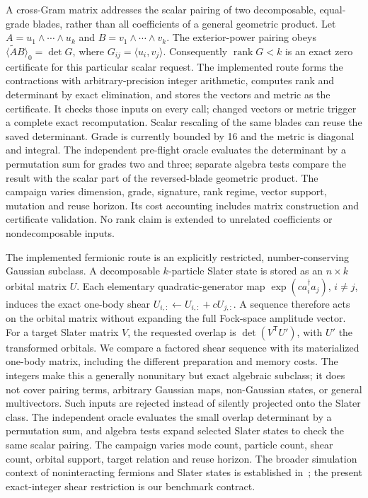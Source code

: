 \documentclass[11pt,a4paper]{article}
\begin{document}
A cross-Gram matrix addresses the scalar pairing of two
decomposable, equal-grade blades, rather than all coefficients of a
general geometric product. Let
\(A=u_1\wedge\cdots\wedge u_k\) and
\(B=v_1\wedge\cdots\wedge v_k\). The exterior-power pairing obeys
\(\langle\widetilde A B\rangle_0=\det G\), where
\(G_{ij}=\langle u_i,v_j\rangle\). Consequently
\(\operatorname{rank}G<k\) is an exact zero certificate for this
particular scalar request. The implemented route forms the contractions
with arbitrary-precision integer arithmetic, computes rank and
determinant by exact elimination, and stores the vectors and metric as
the certificate. It checks those inputs on every call; changed vectors
or metric trigger a complete exact recomputation. Scalar rescaling of
the same blades can reuse the saved determinant. Grade is currently
bounded by 16 and the metric is diagonal and integral. The independent
pre-flight oracle evaluates the determinant by a permutation sum for
grades two and three; separate algebra tests compare the result with
the scalar part of the reversed-blade geometric product. The campaign
varies dimension, grade, signature, rank regime, vector support,
mutation and reuse horizon. Its cost accounting includes matrix
construction and certificate validation. No rank claim is extended
to unrelated coefficients or nondecomposable inputs.

The implemented fermionic route is an explicitly restricted,
number-conserving Gaussian subclass. A decomposable \(k\)-particle
Slater state is stored as an \(n\times k\) orbital matrix \(U\).
Each elementary quadratic-generator map
\(\exp(ca_i^\dagger a_j)\), \(i\ne j\), induces the exact one-body
shear \(U_{i,:}\leftarrow U_{i,:}+cU_{j,:}\). A sequence therefore
acts on the orbital matrix without expanding the full Fock-space
amplitude vector. For a target Slater matrix \(V\), the requested
overlap is \(\det(V^\mathsf{T}U')\), with \(U'\) the transformed
orbitals. We compare a factored shear sequence with its materialized
one-body matrix, including the different preparation and memory costs.
The integers make this a generally nonunitary but exact algebraic
subclass; it does not cover pairing terms, arbitrary Gaussian maps,
non-Gaussian states, or general multivectors. Such inputs are rejected
instead of silently projected onto the Slater class. The independent
oracle evaluates the small overlap determinant by a permutation sum,
and algebra tests expand selected Slater states to check the same
scalar pairing. The campaign varies mode count, particle count, shear
count, orbital support, target relation and reuse horizon. The broader
simulation context of noninteracting fermions and Slater states is
established in~\cite{terhal2002,divincenzo2005}; the present exact-integer
shear restriction is our benchmark contract.
\end{document}
